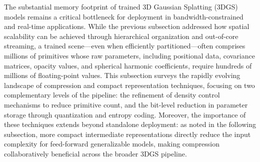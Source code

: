 \documentclass[11pt,a4paper]{article}
\begin{document}
The substantial memory footprint of trained 3D Gaussian Splatting (3DGS) models remains a critical bottleneck for deployment in bandwidth-constrained and real-time applications. While the previous subsection addressed how spatial scalability can be achieved through hierarchical organization and out-of-core streaming, a trained scene---even when efficiently partitioned---often comprises millions of primitives whose raw parameters, including positional data, covariance matrices, opacity values, and spherical harmonic coefficients, require hundreds of millions of floating-point values. This subsection surveys the rapidly evolving landscape of compression and compact representation techniques, focusing on two complementary levels of the pipeline: the refinement of density control mechanisms to reduce primitive count, and the bit-level reduction in parameter storage through quantization and entropy coding. Moreover, the importance of these techniques extends beyond standalone deployment: as noted in the following subsection, more compact intermediate representations directly reduce the input complexity for feed-forward generalizable models, making compression collaboratively beneficial across the broader 3DGS pipeline.
\end{document}
